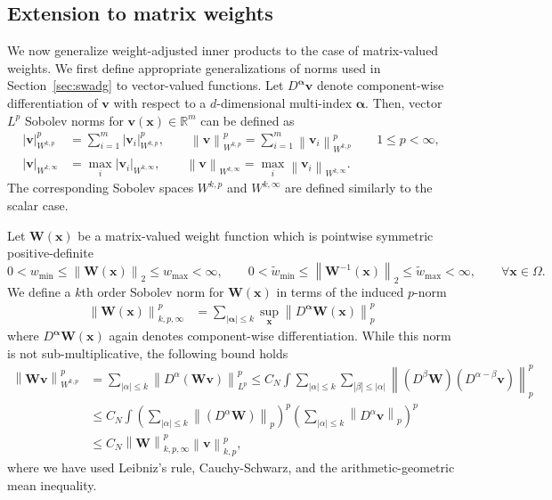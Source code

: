 \documentclass{siamart0216}
\newcommand{\nor}[1]{\left\| #1 \right\|}
\newcommand{\LRp}[1]{\left( #1 \right)}
\newcommand{\LRb}[1]{\left| #1 \right|}
\begin{document}
\subsection{Extension to matrix weights}

We now generalize weight-adjusted inner products to the case of matrix-valued weights.  We first define appropriate generalizations of norms used in Section~\ref{sec:swadg} to vector-valued functions.  Let $D^{\bm{\alpha}}\bm{v}$ denote component-wise differentiation of $\bm{v}$ with respect to a $d$-dimensional multi-index $\bm{\alpha}$.  Then, vector $L^p$ Sobolev norms for $\bm{v}(\bm{x}) \in \mathbb{R}^m$ can be defined as 
\begin{align*}
\LRb{\bm{v}}_{W^{k,p}}^p &= {\sum_{i=1}^m \LRb{\bm{v}_i}_{W^{k,p}}^p}, \qquad \nor{\bm{v}}_{W^{k,p}}^p = {\sum_{i=1}^m \nor{\bm{v}_i}_{W^{k,p}}^p} \qquad 1 \leq p < \infty,\\
\LRb{\bm{v}}_{W^{k,\infty}} &= \max_i \LRb{\bm{v}_i}_{W^{k,\infty}}, \qquad \nor{\bm{v}}_{W^{k,\infty}} = \max_i \nor{\bm{v}_i}_{W^{k,\infty}}.
\end{align*}
The corresponding Sobolev spaces $W^{k,p}$ and $W^{k,\infty}$ are defined similarly to the scalar case.  

Let $\bm{W}(\bm{x})$ be a matrix-valued weight function which is pointwise symmetric positive-definite 
\[
0 < w_{\min} \leq  \nor{\bm{W}(\bm{x})}_2 \leq w_{\max} < \infty, \qquad 0 < \tilde{w}_{\min} \leq  \nor{\bm{W}^{-1}(\bm{x})}_2 \leq \tilde{w}_{\max} < \infty, \qquad \forall \bm{x} \in \Omega.
\]
We define a $k$th order Sobolev norm for $\bm{W}(\bm{x})$ in terms of the induced $p$-norm
\begin{align*}
\nor{\bm{W}(\bm{x})}_{k,p,\infty}^p &= \sum_{\LRb{\bm{\alpha}} \leq k} \sup_{\bm{x}} \nor{D^{\bm{\alpha}}\bm{W}(\bm{x})}^p_p
\end{align*}
where $D^{\bm{\alpha}}\bm{W}(\bm{x})$ again denotes component-wise differentiation.  While this norm is not sub-multiplicative, the following bound holds
\begin{align*}
\nor{\bm{W}{\bm{v}}}_{W^{k,p}}^p &= \sum_{\LRb{\alpha}\leq k} \nor{D^{\alpha}\LRp{\bm{W}\bm{v}}}_{L^p}^p 
\leq C_N \int  \sum_{\LRb{\alpha}\leq k} \sum_{\LRb{\beta}\leq \LRb{\alpha}} \nor{\LRp{D^{\beta}\bm{W}}\LRp{D^{\alpha-\beta}\bm{v}} }_{p}^p \\
&\leq C_N\int \LRp{\sum_{\LRb{\alpha}\leq k} \nor{\LRp{D^{\alpha}\bm{W}}}_p}^p \LRp{\sum_{\LRb{\alpha}\leq k} \nor{D^{\alpha}\bm{v}}_{p} }^p\\
&\leq C_N \nor{\bm{W}}_{k,p,\infty}^p \nor{\bm{v}}_{k,p}^p,
\end{align*}
where we have used Leibniz's rule, Cauchy-Schwarz, and the arithmetic-geometric mean inequality.  
\end{document}
